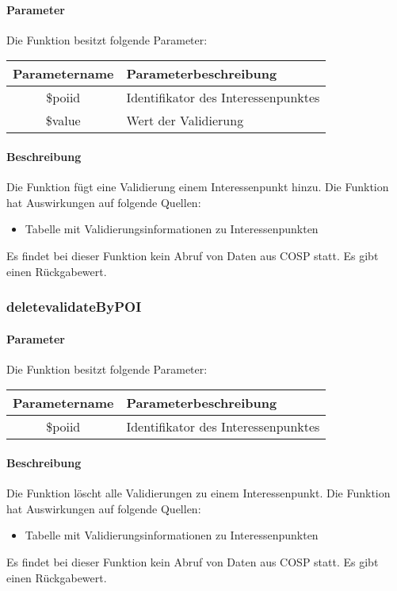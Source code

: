 \paragraph{Parameter} Die Funktion besitzt folgende Parameter:
\begin{table}[H]
	\begin{tabular}{|c|p{11cm}|}
		\hline
		\textbf{Parametername} & \textbf{Parameterbeschreibung} \\ \hline
		\$poiid & Identifikator des Interessenpunktes \\ \hline
		\$value & Wert der Validierung \\ \hline
	\end{tabular}
\end{table}
\paragraph{Beschreibung} Die Funktion fügt eine Validierung einem Interessenpunkt hinzu. Die Funktion hat Auswirkungen auf folgende Quellen:
\begin{itemize}
	\item Tabelle mit Validierungsinformationen zu Interessenpunkten
\end{itemize}
Es findet bei dieser Funktion kein Abruf von Daten aus {\glqq COSP\grqq} statt. Es gibt einen Rückgabewert.
\subsubsection{deletevalidateByPOI}
\paragraph{Parameter} Die Funktion besitzt folgende Parameter:
\begin{table}[H]
	\begin{tabular}{|c|p{11cm}|}
		\hline
		\textbf{Parametername} & \textbf{Parameterbeschreibung} \\ \hline
		\$poiid & Identifikator des Interessenpunktes \\ \hline
	\end{tabular}
\end{table}
\paragraph{Beschreibung} Die Funktion löscht alle Validierungen zu einem Interessenpunkt. Die Funktion hat Auswirkungen auf folgende Quellen:
\begin{itemize}
	\item Tabelle mit Validierungsinformationen zu Interessenpunkten
\end{itemize}
Es findet bei dieser Funktion kein Abruf von Daten aus {\glqq COSP\grqq} statt. Es gibt einen Rückgabewert.
